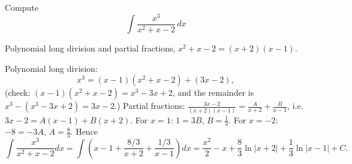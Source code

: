 
\begin{question}
Compute
\[ \int\frac{x^3}{x^2+x-2}\,dx \]
\end{question}

\begin{hint}
Polynomial long division and partial fractions, $x^2+x-2=(x+2)(x-1)$.
\end{hint}

\begin{solution}
Polynomial long division:
\[ x^3=(x-1)(x^2+x-2)+(3x-2), \]
(check: $(x-1)(x^2+x-2)=x^3-3x+2$, and the remainder is $x^3-(x^3-3x+2)=3x-2$.) Partial fractions: $\frac{3x-2}{(x+2)(x-1)}=\frac{A}{x+2}+\frac{B}{x-1}$, i.e. $3x-2=A(x-1)+B(x+2)$. For $x=1$: $1=3B$, $B=\frac13$. For $x=-2$: $-8=-3A$, $A=\frac83$. Hence
\[ \int\frac{x^3}{x^2+x-2}dx=\int\left(x-1+\frac{8/3}{x+2}+\frac{1/3}{x-1}\right)dx=\boxed{\frac{x^2}{2}-x+\frac83\ln|x+2|+\frac13\ln|x-1|+C}. \]
\end{solution}
